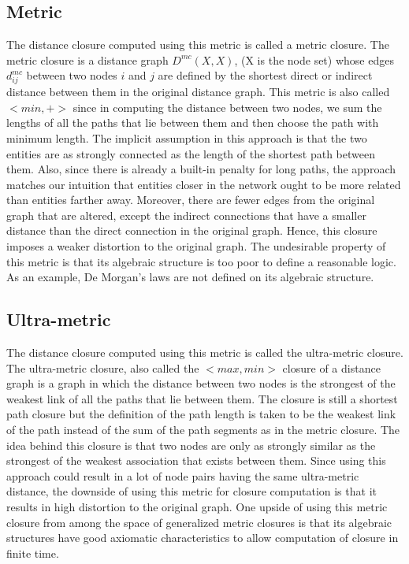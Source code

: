 \documentclass[12pt]{article}
\begin{document}
\subsection{Metric}
The distance closure computed using this metric is called a metric closure. The metric closure is a distance graph $D^{mc}(X,X)$, (X is the node set) whose edges $d_{ij}^{mc}$ between two nodes $i$ and $j$ are defined by the shortest direct or indirect distance between them in the original distance graph. This metric is also called $<min, +>$ since in computing the distance between two nodes, we sum the lengths of all the paths that lie between them and then choose the path with minimum length. The implicit assumption in this approach is that the two entities are as strongly connected as the length of the shortest path between them. Also, since there is already a built-in penalty for long paths, the approach matches our intuition that entities closer in the network ought to be more related than entities farther away. Moreover, there are fewer edges from the original graph that are altered, except the indirect connections that have a smaller distance than the direct connection in the original graph. Hence, this closure imposes a weaker distortion to the original graph. The undesirable property of this metric is that its algebraic structure is too poor to define a reasonable logic. As an example, De Morgan's laws are not defined on its algebraic structure.

\subsection{Ultra-metric} 
The distance closure computed using this metric is called the ultra-metric closure. The ultra-metric closure, also called the $<max, min>$ closure of a distance graph is a graph in which the distance between two nodes is the strongest of the weakest link of all the paths that lie between them. The closure is still a shortest path closure but the definition of the path length is taken to be the weakest link of the path instead of the sum of the path segments as in the metric closure. The idea behind this closure is that two nodes are only as strongly similar as the strongest of the weakest association that exists between them. Since using this approach could result in a lot of node pairs having the same ultra-metric distance, the downside of using this metric for closure computation is that it results in high distortion to the original graph. One upside of using this metric closure from among the space of generalized metric closures is that its algebraic structures have good axiomatic characteristics to allow computation of closure in finite time.
\end{document}

